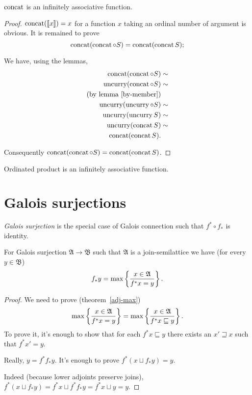 \begin{thm}
$\operatorname{concat}$ is an infinitely associative function.\end{thm}
\begin{proof}
$\operatorname{concat}(\llbracket x\rrbracket)=x$ for a function $x$ taking an
ordinal number of argument is obvious. It is remained to prove
\[
\operatorname{concat}(\operatorname{concat}\circ S)=\operatorname{concat}(\operatorname{concat} S);
\]


We have, using the lemmas,
\begin{align*}
\operatorname{concat}(\operatorname{concat}\circ S) & \sim\\
\operatorname{uncurry}(\operatorname{concat}\circ S) & \sim\\
\text{(by lemma \ref{by-member})}\\
\operatorname{uncurry}(\operatorname{uncurry}\circ S) & \sim\\
\operatorname{uncurry}(\operatorname{uncurry} S) & \sim\\
\operatorname{uncurry}(\operatorname{concat} S) & \sim\\
\operatorname{concat}(\operatorname{concat} S).
\end{align*}


Consequently $\operatorname{concat}(\operatorname{concat}\circ S)=\operatorname{concat}(\operatorname{concat} S)$.\end{proof}
\begin{cor}
Ordinated product is an infinitely associative function.
\end{cor}

\section{Galois surjections}

\begin{defn}
  \emph{Galois surjection} is the special case of Galois connection such
  that $f^{\ast} \circ f_{\ast} $ is identity.
\end{defn}

\begin{prop}\label{gal-eq}
  For Galois surjection $\mathfrak{A} \rightarrow \mathfrak{B}$ such that
  $\mathfrak{A}$ is a join-semilattice we have (for every $y \in
  \mathfrak{B}$)
  \[ f_{\ast} y = \max \left\{ \frac{ x \in \mathfrak{A} }{
     f^{\ast} x = y }\right\} . \]
\end{prop}

\begin{proof}
  We need to prove (theorem~\ref{adj-max})
  \[ \max \left\{ \frac{ x \in \mathfrak{A} }{ f^{\ast} x = y }\right\} =
     \max \left\{ \frac{ x \in \mathfrak{A} }{ f^{\ast} x \sqsubseteq y }\right\} . \]
  To prove it, it's enough to show that for each $f^{\ast} x \sqsubseteq y$
  there exists an $x' \sqsupseteq x$ such that $f^{\ast} x' = y$.
  
  Really, $y = f^{\ast} f_{\ast} y$. It's enough to prove $f^{\ast} (x \sqcup
  f_{\ast} y) = y$.
  
  Indeed (because lower adjoints preserve joins),
  $f^{\ast} (x \sqcup f_{\ast} y) = f^{\ast} x \sqcup f^{\ast} f_{\ast} y = f^{\ast} x \sqcup y = y$.
\end{proof}

